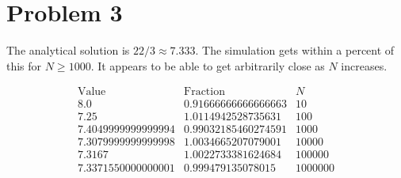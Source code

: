 \documentclass[11pt,letterpaper]{article}
\begin{document}
\section*{Problem 3}

The analytical solution is $22/3 \approx 7.333$. The simulation gets within a percent of this for $N \ge 1000$. It appears to be able to get arbitrarily close as $N$ increases.

\[
\begin{array}{ccc}
\text{Value} & \text{Fraction} & N \\
8.0 & 0.91666666666666663 & 10 \\
7.25 & 1.0114942528735631 & 100 \\
7.4049999999999994 & 0.99032185460274591 & 1000 \\
7.3079999999999998 & 1.0034665207079001 & 10000 \\
7.3167 & 1.0022733381624684 & 100000 \\
7.3371550000000001 & 0.999479135078015 & 1000000
\end{array}
\]
\end{document}
